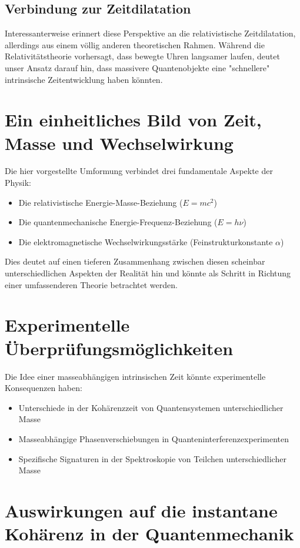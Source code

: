 \documentclass{article}
\begin{document}
	\subsection{Verbindung zur Zeitdilatation}
	
	Interessanterweise erinnert diese Perspektive an die relativistische Zeitdilatation, allerdings aus einem völlig anderen theoretischen Rahmen. Während die Relativitätstheorie vorhersagt, dass bewegte Uhren langsamer laufen, deutet unser Ansatz darauf hin, dass massivere Quantenobjekte eine "schnellere" intrinsische Zeitentwicklung haben könnten.
	
	\section{Ein einheitliches Bild von Zeit, Masse und Wechselwirkung}
	
	Die hier vorgestellte Umformung verbindet drei fundamentale Aspekte der Physik:
	\begin{itemize}
		\item Die relativistische Energie-Masse-Beziehung ($E = mc^2$)
		\item Die quantenmechanische Energie-Frequenz-Beziehung ($E = h\nu$)
		\item Die elektromagnetische Wechselwirkungsstärke (Feinstrukturkonstante $\alpha$)
	\end{itemize}
	
	Dies deutet auf einen tieferen Zusammenhang zwischen diesen scheinbar unterschiedlichen Aspekten der Realität hin und könnte als Schritt in Richtung einer umfassenderen Theorie betrachtet werden.
	
	\section{Experimentelle Überprüfungsmöglichkeiten}
	
	Die Idee einer masseabhängigen intrinsischen Zeit könnte experimentelle Konsequenzen haben:
	\begin{itemize}
		\item Unterschiede in der Kohärenzzeit von Quantensystemen unterschiedlicher Masse
		\item Masseabhängige Phasenverschiebungen in Quanteninterferenzexperimenten
		\item Spezifische Signaturen in der Spektroskopie von Teilchen unterschiedlicher Masse
	\end{itemize}
	
	\section{Auswirkungen auf die instantane Kohärenz in der Quantenmechanik}
	
\end{document}
